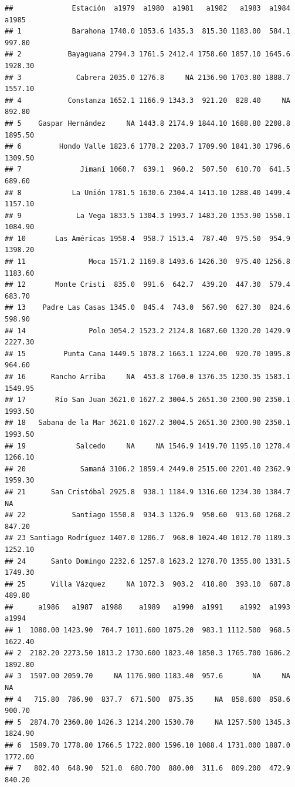 \documentclass[11pt,]{article}
\begin{document}
\begin{verbatim}
##              Estación  a1979  a1980  a1981   a1982   a1983  a1984   a1985
## 1            Barahona 1740.0 1053.6 1435.3  815.30 1183.00  584.1  997.80
## 2           Bayaguana 2794.3 1761.5 2412.4 1758.60 1857.10 1645.6 1928.30
## 3             Cabrera 2035.0 1276.8     NA 2136.90 1703.80 1888.7 1557.10
## 4           Constanza 1652.1 1166.9 1343.3  921.20  828.40     NA  892.80
## 5    Gaspar Hernández     NA 1443.8 2174.9 1844.10 1688.80 2208.8 1895.50
## 6         Hondo Valle 1823.6 1778.2 2203.7 1709.90 1841.30 1796.6 1309.50
## 7              Jimaní 1060.7  639.1  960.2  507.50  610.70  641.5  689.60
## 8            La Unión 1781.5 1630.6 2304.4 1413.10 1288.40 1499.4 1157.10
## 9             La Vega 1833.5 1304.3 1993.7 1483.20 1353.90 1550.1 1084.90
## 10       Las Américas 1958.4  958.7 1513.4  787.40  975.50  954.9 1398.20
## 11               Moca 1571.2 1169.8 1493.6 1426.30  975.40 1256.8 1183.60
## 12       Monte Cristi  835.0  991.6  642.7  439.20  447.30  579.4  683.70
## 13    Padre Las Casas 1345.0  845.4  743.0  567.90  627.30  824.6  598.90
## 14               Polo 3054.2 1523.2 2124.8 1687.60 1320.20 1429.9 2227.30
## 15         Punta Cana 1449.5 1078.2 1663.1 1224.00  920.70 1095.8  964.60
## 16      Rancho Arriba     NA  453.8 1760.0 1376.35 1230.35 1583.1 1549.95
## 17       Río San Juan 3621.0 1627.2 3004.5 2651.30 2300.90 2350.1 1993.50
## 18   Sabana de la Mar 3621.0 1627.2 3004.5 2651.30 2300.90 2350.1 1993.50
## 19            Salcedo     NA     NA 1546.9 1419.70 1195.10 1278.4 1266.10
## 20             Samaná 3106.2 1859.4 2449.0 2515.00 2201.40 2362.9 1959.30
## 21      San Cristóbal 2925.8  938.1 1184.9 1316.60 1234.30 1384.7      NA
## 22           Santiago 1550.8  934.3 1326.9  950.60  913.60 1268.2  847.20
## 23 Santiago Rodríguez 1407.0 1206.7  968.0 1024.40 1012.70 1189.3 1252.10
## 24      Santo Domingo 2232.6 1257.8 1623.2 1278.70 1355.00 1331.5 1749.30
## 25      Villa Vázquez     NA 1072.3  903.2  418.80  393.10  687.8  489.80
##      a1986   a1987  a1988    a1989   a1990  a1991    a1992  a1993   a1994
## 1  1080.00 1423.90  704.7 1011.600 1075.20  983.1 1112.500  968.5 1622.40
## 2  2182.20 2273.50 1813.2 1730.600 1823.40 1850.3 1765.700 1606.2 1892.80
## 3  1597.00 2059.70     NA 1176.900 1183.40  957.6       NA     NA      NA
## 4   715.80  786.90  837.7  671.500  875.35     NA  858.600  858.6  900.70
## 5  2874.70 2360.80 1426.3 1214.200 1530.70     NA 1257.500 1345.3 1824.90
## 6  1589.70 1778.80 1766.5 1722.800 1596.10 1088.4 1731.000 1887.0 1772.00
## 7   802.40  648.90  521.0  680.700  880.00  311.6  809.200  472.9  840.20

\end{verbatim}
\end{document}
